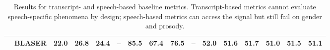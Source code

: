 \begin{table}[t]
\begin{tabular}{ll|rrrc|rrrc|rrr|rrr}
 & \textsc{BLASER} & \cellcolor[RGB]{219,239,239}22.0 & \cellcolor[RGB]{212,236,236}26.8 & \cellcolor[RGB]{215,238,237}24.4 & -- & \cellcolor[RGB]{184,224,224}85.5 & \cellcolor[RGB]{253,254,254}67.4 & \cellcolor[RGB]{208,234,234}76.5 & -- & \cellcolor[RGB]{254,242,233}52.0 & \cellcolor[RGB]{254,244,236}51.6 & \cellcolor[RGB]{253,231,214}51.7 & \cellcolor[RGB]{232,168,205}\textbf{51.0} & \cellcolor[RGB]{232,168,205}\textbf{51.5} & \cellcolor[RGB]{232,168,205}\textbf{51.1} \\
\bottomrule
\end{tabular}
\caption{Results for transcript- and speech-based baseline metrics. Transcript-based metrics cannot evaluate speech-specific phenomena by design; speech-based metrics can access the signal but still fail on gender and prosody.}\label{tab:baselines}
\end{table}
